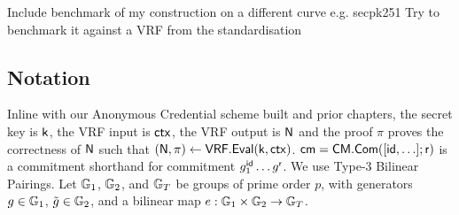 Include benchmark of my construction on a different curve e.g. secpk251
Try to benchmark it against a VRF from the standardisation







\subsection*{Notation}
Inline with our Anonymous Credential scheme built and prior chapters, the secret key is $\mathsf{k}$, the VRF input is $\mathsf{ctx}$, the VRF output is $\mathsf{N}$ and the proof $\pi$ proves the correctness of $\mathsf{N}$ such that $(\mathsf{N}, \pi) \gets \mathsf{VRF.Eval}(\mathsf{k}, \mathsf{ctx})$. $\mathsf{cm} = \mathsf{CM.Com}([\mathsf{id},\ldots];\mathsf{r})$ is a commitment shorthand for commitment $g_1^{\mathsf{id}} \ldots g^{\mathsf{r}}$. We use Type-3 Bilinear Pairings. Let $\mathbb{G}_1$, $\mathbb{G}_2$, and $\mathbb{G}_T$ be groups of prime order $p$, with generators $g \in \mathbb{G}_1$, $\tilde{g} \in \mathbb{G}_2$, and a bilinear map $e: \mathbb{G}_1 \times \mathbb{G}_2 \to \mathbb{G}_T$.


